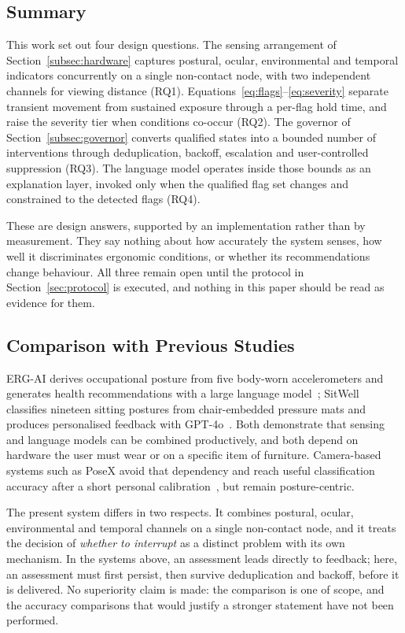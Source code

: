 \subsection{Summary}

This work set out four design questions. The sensing arrangement of
Section~\ref{subsec:hardware} captures postural, ocular, environmental and temporal indicators
concurrently on a single non-contact node, with two independent channels for viewing distance
(RQ1). Equations~\ref{eq:flags}--\ref{eq:severity} separate transient movement from sustained
exposure through a per-flag hold time, and raise the severity tier when conditions co-occur (RQ2).
The governor of Section~\ref{subsec:governor} converts qualified states into a bounded number of
interventions through deduplication, backoff, escalation and user-controlled suppression (RQ3). The
language model operates inside those bounds as an explanation layer, invoked only when the
qualified flag set changes and constrained to the detected flags (RQ4).

These are design answers, supported by an implementation rather than by measurement. They say
nothing about how accurately the system senses, how well it discriminates ergonomic conditions, or
whether its recommendations change behaviour. All three remain open until the protocol in
Section~\ref{sec:protocol} is executed, and nothing in this paper should be read as evidence for
them.

\subsection{Comparison with Previous Studies}

ERG-AI derives occupational posture from five body-worn accelerometers and generates health
recommendations with a large language model~\cite{ref14}; SitWell classifies nineteen sitting
postures from chair-embedded pressure mats and produces personalised feedback with
GPT-4o~\cite{ref15}. Both demonstrate that sensing and language models can be combined
productively, and both depend on hardware the user must wear or on a specific item of furniture.
Camera-based systems such as PoseX avoid that dependency and reach useful classification accuracy
after a short personal calibration~\cite{ref19}, but remain posture-centric.

The present system differs in two respects. It combines postural, ocular, environmental and
temporal channels on a single non-contact node, and it treats the decision of \emph{whether to
interrupt} as a distinct problem with its own mechanism. In the systems above, an assessment leads
directly to feedback; here, an assessment must first persist, then survive deduplication and
backoff, before it is delivered. No superiority claim is made: the comparison is one of scope, and
the accuracy comparisons that would justify a stronger statement have not been performed.


